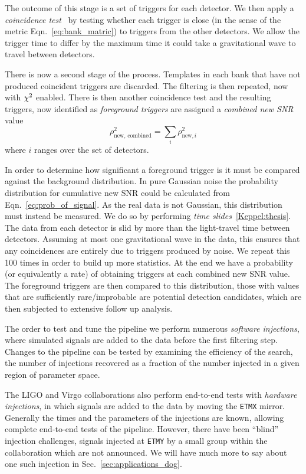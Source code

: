 The outcome of this stage is a set of triggers for each detector.  We then
apply a \emph{coincidence test}~\cite{Robinson:2008} by testing
whether each trigger is close (in the sense of the metric
Eqn.~\ref{eq:bank_matric}) to triggers from the other detectors.  We
allow the trigger time to differ by the maximum time it could take a
gravitational wave to travel between detectors.

There is now a second stage of the process.  Templates in each bank
that have not produced coincident triggers are discarded.  The
filtering is then repeated, now with $\chi^2$ enabled.  There is then
another coincidence test and the resulting triggers, now identified as
\emph{foreground triggers} are assigned a \emph{combined new SNR}
value
%
\begin{equation*}
\rho_{\textrm{new, combined}}^2 = \sum_i \rho_{\textrm{new}, i}^2
\end{equation*}
%
where $i$ ranges over the set of detectors.

In order to determine how significant a foreground trigger is it must
be compared against the background distribution.  In pure Gaussian
noise the probability distribution for cumulative new SNR could be
calculated from Eqn.~\ref{eq:prob_of_signal}.  As the real data is not
Gaussian, this distribution must instead be measured.  We do so by
performing \emph{time slides}~\ref{Keppel:thesis}.  The data from each
detector is slid by more than the light-travel time between detectors.
Assuming at most one gravitational wave in the data, this ensures that
any coincidences are entirely due to triggers produced by noise.  We
repeat this 100 times in order to build up more statistics.  At the
end we have a probability (or equivalently a rate) of obtaining
triggers at each combined new SNR value.  The foreground triggers are
then compared to this distribution, those with values that are
sufficiently rare/improbable are potential detection candidates, which
are then subjected to extensive follow up analysis.

The order to test and tune the pipeline we perform numerous
\emph{software injections}, where simulated signals are added to the
data before the first filtering step.  Changes to the pipeline can be
tested by examining the efficiency of the search, the number of
injections recovered as a fraction of the number injected in a given
region of parameter space.

The LIGO and Virgo collaborations also perform end-to-end tests with
\emph{hardware injections}, in which signals are added to the data by
moving the \texttt{ETMX} mirror.  Generally the times and the
parameters of the injections are known, allowing complete end-to-end
tests of the pipeline.  However, there have been ``blind'' injection
challenges, signals injected at \texttt{ETMY} by a small group within
the collaboration which are not announced.  We will have much more to
say about one such injection in Sec.~\ref{sec:applications_dog}.

